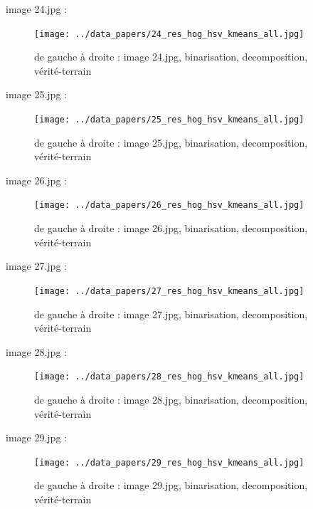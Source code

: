 \documentclass{book}
\begin{document}
image 24.jpg : 
\begin{figure}[H]
\begin{center}
\texttt{[image: ../data\_papers/24\_res\_hog\_hsv\_kmeans\_all.jpg]}
\end{center}
\caption{de gauche à droite : image 24.jpg, binarisation, decomposition, vérité-terrain}
\label{24}
\end{figure}
\clearpage


image 25.jpg : 
\begin{figure}[H]
\begin{center}
\texttt{[image: ../data\_papers/25\_res\_hog\_hsv\_kmeans\_all.jpg]}
\end{center}
\caption{de gauche à droite : image 25.jpg, binarisation, decomposition, vérité-terrain}
\label{25}
\end{figure}
\clearpage


image 26.jpg : 
\begin{figure}[H]
\begin{center}
\texttt{[image: ../data\_papers/26\_res\_hog\_hsv\_kmeans\_all.jpg]}
\end{center}
\caption{de gauche à droite : image 26.jpg, binarisation, decomposition, vérité-terrain}
\label{26}
\end{figure}
\clearpage


image 27.jpg : 
\begin{figure}[H]
\begin{center}
\texttt{[image: ../data\_papers/27\_res\_hog\_hsv\_kmeans\_all.jpg]}
\end{center}
\caption{de gauche à droite : image 27.jpg, binarisation, decomposition, vérité-terrain}
\label{27}
\end{figure}
\clearpage


image 28.jpg : 
\begin{figure}[H]
\begin{center}
\texttt{[image: ../data\_papers/28\_res\_hog\_hsv\_kmeans\_all.jpg]}
\end{center}
\caption{de gauche à droite : image 28.jpg, binarisation, decomposition, vérité-terrain}
\label{28}
\end{figure}
\clearpage


image 29.jpg : 
\begin{figure}[H]
\begin{center}
\texttt{[image: ../data\_papers/29\_res\_hog\_hsv\_kmeans\_all.jpg]}
\end{center}
\caption{de gauche à droite : image 29.jpg, binarisation, decomposition, vérité-terrain}
\label{29}
\end{figure}
\clearpage
\end{document}
